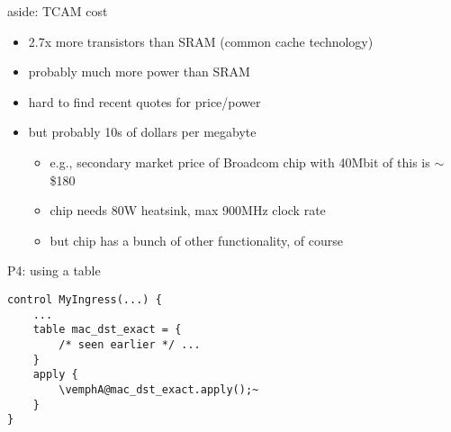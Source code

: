 \begin{frame}{aside: TCAM cost}
    \begin{itemize}
    \item 2.7x more transistors than SRAM (common cache technology)
    \item probably much more power than SRAM
    \item hard to find recent quotes for price/power
    \item but probably 10s of dollars per megabyte
        \begin{itemize}
        \item e.g., secondary market price of Broadcom chip with 40Mbit of this is $\sim$\$180
        \item chip needs 80W heatsink, max 900MHz clock rate
        \item but chip has a bunch of other functionality, of course
        \end{itemize}
    \end{itemize}
\end{frame}

\begin{frame}[fragile]{P4: using a table}
\providecommand{\vemphA}[1]{\myemph<2>{#1}}
\providecommand{\vemphB}[1]{\myemph<3>{#1}}
\providecommand{\vemphC}[1]{\myemph<4>{#1}}
\providecommand{\vemphD}[1]{\myemph<5>{#1}}
\begin{Verbatim}[fontsize=\small,commandchars=\\@~]
control MyIngress(...) {
    ...
    table mac_dst_exact = { 
        /* seen earlier */ ...
    }
    apply {
        \vemphA@mac_dst_exact.apply();~
    }
}
\end{Verbatim}
\end{frame}


